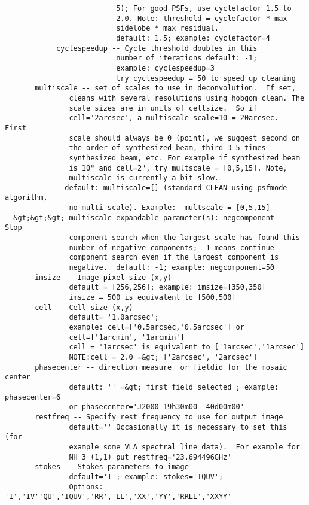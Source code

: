 \begin{verbatim}
                          5); For good PSFs, use cyclefactor 1.5 to
                          2.0. Note: threshold = cyclefactor * max
                          sidelobe * max residual.
                          default: 1.5; example: cyclefactor=4
            cyclespeedup -- Cycle threshold doubles in this
                          number of iterations default: -1;
                          example: cyclespeedup=3
                          try cyclespeedup = 50 to speed up cleaning 
       multiscale -- set of scales to use in deconvolution.  If set,
               cleans with several resolutions using hobgom clean. The
               scale sizes are in units of cellsize.  So if
               cell='2arcsec', a multiscale scale=10 = 20arcsec.  First
               scale should always be 0 (point), we suggest second on
               the order of synthesized beam, third 3-5 times
               synthesized beam, etc. For example if synthesized beam
               is 10" and cell=2", try multscale = [0,5,15]. Note,
               multiscale is currently a bit slow.
              default: multiscale=[] (standard CLEAN using psfmode algorithm,
               no multi-scale). Example:  multscale = [0,5,15] 
  &gt;&gt;&gt; multiscale expandable parameter(s): negcomponent -- Stop
               component search when the largest scale has found this
               number of negative components; -1 means continue
               component search even if the largest component is
               negative.  default: -1; example: negcomponent=50
       imsize -- Image pixel size (x,y)
               default = [256,256]; example: imsize=[350,350]
               imsize = 500 is equivalent to [500,500]
       cell -- Cell size (x,y)
               default= '1.0arcsec';
               example: cell=['0.5arcsec,'0.5arcsec'] or
               cell=['1arcmin', '1arcmin']
               cell = '1arcsec' is equivalent to ['1arcsec','1arcsec']
               NOTE:cell = 2.0 =&gt; ['2arcsec', '2arcsec']
       phasecenter -- direction measure  or fieldid for the mosaic center
               default: '' =&gt; first field selected ; example: phasecenter=6
               or phasecenter='J2000 19h30m00 -40d00m00'
       restfreq -- Specify rest frequency to use for output image
               default='' Occasionally it is necessary to set this (for
               example some VLA spectral line data).  For example for
               NH_3 (1,1) put restfreq='23.694496GHz'
       stokes -- Stokes parameters to image
               default='I'; example: stokes='IQUV';
               Options: 'I','IV''QU','IQUV','RR','LL','XX','YY','RRLL','XXYY'

\end{verbatim}
